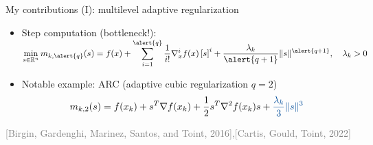 \documentclass{beamer}
\begin{document}
\begin{frame}{My contributions (I): multilevel adaptive regularization  }





	\begin{tcolorbox}[
	 title=AR$q$:  adaptive regularization methods of order $q\geq 1$,
    colback=gray!15,
    colframe=gray!50,
    arc=3mm,
    boxrule=0pt
]


	
	 
	\footnotesize{
	\begin{itemize}
	

	\item  Step computation (\alert{bottleneck!}): $\displaystyle{
	\min_{s\in\mathbb{R}^n} m_{k,\alert{q}}(s)=f(x)+\sum_{i=1}^{\alert{q}}\frac{1}{i!}\nabla_x^i f(x)\left[ s\right]^i+\frac{\lambda_k}{\alert{q+1}}\|s\|^{\alert{q+1}},\quad \lambda_k>0}
$

\item Notable example: \textcolor{myblue}{ARC} (adaptive cubic regularization \textcolor{myblue}{$q=2$})
		$$
		m_{k,2}(s)=f(x_k)+s^T\nabla f(x_k)+\frac{1}{2}s^T\nabla^2f(x_k)s+\textcolor{myblue}{\frac{\lambda_k}{3}\|s\|^{3}}
$$


	\end{itemize}}
\end{tcolorbox}

\vspace{-0.2cm}





			
		

	
{\tiny
\parbox{\linewidth}{%
\textcolor{gray}{%
[Birgin, Gardenghi, Marinez, Santos, and Toint,
2016],[Cartis, Gould, Toint,
2022]}}
}
		
		
				
\vspace{-0.3cm}

		\begin{tcolorbox}[
        title={\faSmile\  Multilevel extension MAR$q$ 
},
    colback=green!10,
    colframe=green!70!black,
        fonttitle=\bfseries,
]


\end{tcolorbox}
\end{frame}
\end{document}
